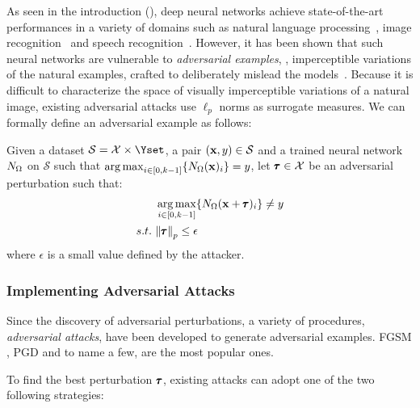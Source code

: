 As seen in the introduction (), deep neural networks achieve state-of-the-art performances in a variety of domains such as natural language processing~\cite{radford2018Language}, image recognition~\cite{he2016deep} and speech recognition~\cite{hinton2012deep}.
However, it has been shown that such neural networks are vulnerable to \emph{adversarial examples}, \ie, imperceptible variations of the natural examples, crafted to deliberately mislead the models~\cite{globerson2006nightmare,biggio2013evasion,szegedy2013intriguing}.
Because it is difficult to characterize the space of visually imperceptible variations of a natural image, existing adversarial attacks use $\ell_p$ norms as surrogate measures.
We can formally define an adversarial example as follows:
\begin{definition}
  Given a dataset $\mathcal{S} = \Xset \times \Yset$, a pair $(\mathbf{x}, y) \in \mathcal{S}$ and a trained neural network $N_\Omega$ on $\mathcal{S}$ such that $\operatorname*{arg\,max}_{i \in [0,k-1]} \{ N_\Omega(\mathbf{x})_i \} = y$, let $\pmb{\tau} \in \mathcal{X}$ be an adversarial perturbation such that:
  \begin{align}
    &\operatorname*{arg\,max}_{i \in [0,k-1]} \{ N_\Omega (\mathbf{x} + \pmb{\tau})_i \} \neq y \\
    s.t.\ &\norm{\pmb{\tau}}_p \leq \epsilon \notag
  \end{align}
  where $\epsilon$ is a small value defined by the attacker. 
\end{definition}

\subsubsection{Implementing Adversarial Attacks}
\label{subsubsection:ch2-adversarial_attacks}

Since the discovery of adversarial perturbations, a variety of procedures, \aka \emph{adversarial attacks}, have been developed to generate adversarial examples.
FGSM \cite{goodfellow2014explaining}, PGD \cite{madry2018towards} and \cite{carlini2017towards} to name a few, are the most popular ones.

To find the best perturbation $\pmb{\tau}$, existing attacks can adopt one of the two following strategies:

